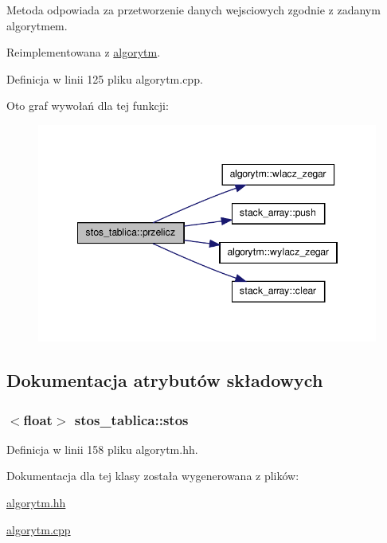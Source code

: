 \-Metoda odpowiada za przetworzenie danych wejsciowych zgodnie z zadanym algorytmem. 



\-Reimplementowana z \hyperlink{classalgorytm_af3f92bf537b1f2e1f93173983e838449}{algorytm}.



\-Definicja w linii 125 pliku algorytm.\-cpp.



\-Oto graf wywołań dla tej funkcji\-:\nopagebreak
\begin{figure}[H]
\begin{center}
\leavevmode
\includegraphics[width=346pt]{classstos__tablica_a44ec89c9723d4034e46ae3b51b01faea_cgraph}
\end{center}
\end{figure}




\subsection{\-Dokumentacja atrybutów składowych}
\hypertarget{classstos__tablica_a8aa72aa52bd2436cb12d9e1c8e077389}{
\subsubsection[{stos}]{$<$float$>$ {\bf stos\-\_\-tablica\-::stos}}}\label{classstos__tablica_a8aa72aa52bd2436cb12d9e1c8e077389}


\-Definicja w linii 158 pliku algorytm.\-hh.



\-Dokumentacja dla tej klasy została wygenerowana z plików\-:\begin{DoxyCompactItemize}
\item 
\hyperlink{algorytm_8hh}{algorytm.\-hh}\item 
\hyperlink{algorytm_8cpp}{algorytm.\-cpp}\end{DoxyCompactItemize}
